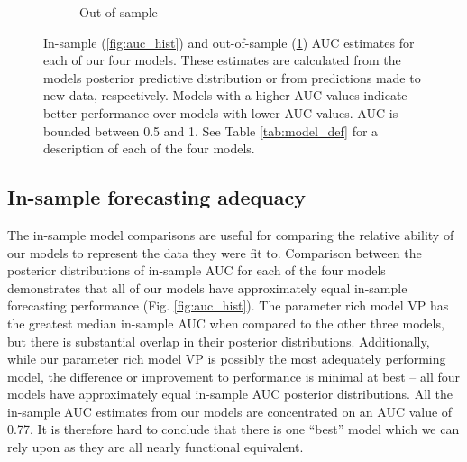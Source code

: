 \documentclass[12pt,letterpaper]{article}
\begin{document}
\begin{refsection}
\begin{figure}[ht]
\begin{subfigure}[ht]{0.45\textwidth}
  \caption{Out-of-sample}
  \label{fig:fold_auc}
 \end{subfigure}
 \caption{In-sample (\ref{fig:auc_hist}) and out-of-sample (\ref{fig:fold_auc}) AUC estimates for each of our four models. These estimates are calculated from the models posterior predictive distribution or from predictions made to new data, respectively. Models with a higher AUC values indicate better performance over models with lower AUC values. AUC is bounded between 0.5 and 1. See Table \ref{tab:model_def} for a description of each of the four models.}
 \label{fig:auc_compare}
\end{figure}

\subsection{In-sample forecasting adequacy}

The in-sample model comparisons are useful for comparing the relative ability of our models to represent the data they were fit to. Comparison between the posterior distributions of in-sample AUC for each of the four models demonstrates that all of our models have approximately equal in-sample forecasting performance (Fig. \ref{fig:auc_hist}). The parameter rich model VP has the greatest median in-sample AUC when compared to the other three models, but there is substantial overlap in their posterior distributions. Additionally, while our parameter rich model VP is possibly the most adequately performing model, the difference or improvement to performance is minimal at best -- all four models have approximately equal in-sample AUC posterior distributions. All the in-sample AUC estimates from our models are concentrated on an AUC value of 0.77. It is therefore hard to conclude that there is one ``best'' model which we can rely upon as they are all nearly functional equivalent. 




\end{refsection}
\end{document}
